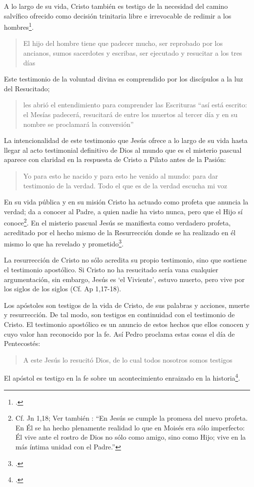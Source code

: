 A lo largo de su vida, Cristo también es testigo de la necesidad del camino salvífico ofrecido como decisión trinitaria libre e irrevocable de redimir a los hombres\footcite[Cf.][128]{prades2015testimonio}. \blockquote[][\,(Mc 8,31)]{El hijo del hombre tiene que padecer mucho, ser reprobado por los ancianos, sumos sacerdotes y escribas, ser ejecutado y resucitar a los tres días}. Este testimonio de la voluntad divina es comprendido por los discípulos a la luz del Resucitado; \blockquote[][\,(Cf. Lc 24,45-47a)]{les abrió el entendimiento para comprender las Escrituras \textelp{} ``así está escrito: el Mesías padecerá, resucitará de entre los muertos al tercer día y en su nombre se proclamará la conversión''}.

La intencionalidad de este testimonio que Jesús ofrece a lo largo de su vida hasta llegar al acto testimonial definitivo de Dios al mundo que es el misterio pascual aparece con claridad en la respuesta de Cristo a Pilato antes de la Pasión: \blockquote[][\,(Jn 18,37)]{Yo para esto he nacido y para esto he venido al mundo: para dar testimonio de la verdad. Todo el que es de la verdad escucha mi voz}. En su vida pública y en su misión Cristo ha actuado como profeta que anuncia la verdad; da a conocer al Padre, a quien nadie ha visto nunca, pero que el Hijo sí conoce\footnote{Cf. Jn 1,18; Ver también \Cite[28]{ratzinger2007jdenaz}: \enquote{En Jesús se cumple la promesa del nuevo profeta. En Él se ha hecho plenamente realidad lo que en Moisés era sólo imperfecto: Él vive ante el rostro de Dios no sólo como amigo, sino como Hijo; vive en la más íntima unidad con el Padre.}}. En el misterio pascual Jesús se manifiesta como verdadero profeta, acreditado por el hecho mismo de la Resurrección donde se ha realizado en él mismo lo que ha revelado y prometido\footcite[128]{prades2015testimonio}.

La resurrección de Cristo no sólo acredita su propio testimonio, sino que sostiene el testimonio apostólico. Si Cristo no ha resucitado sería vana cualquier argumentación, sin embargo, Jesús es `el Viviente', estuvo muerto, pero vive por los siglos de los siglos (Cf. Ap 1,17-18).

Los apóstoles son testigos de la vida de Cristo, de sus palabras y acciones, muerte y resurrección. De tal modo, son testigos en continuidad con el testimonio de Cristo. El testimonio apostólico es un anuncio de estos hechos que ellos conocen y cuyo valor han reconocido por la fe. Así Pedro proclama estas cosas el día de Pentecostés: \blockquote[][\,(Hch 2,32)]{A este Jesús lo resucitó Dios, de lo cual todos nosotros somos testigos}. El apóstol es testigo en la fe sobre un acontecimiento enraizado en la historia\footcite[Cf.][402; 406]{ninot2009tf}.

